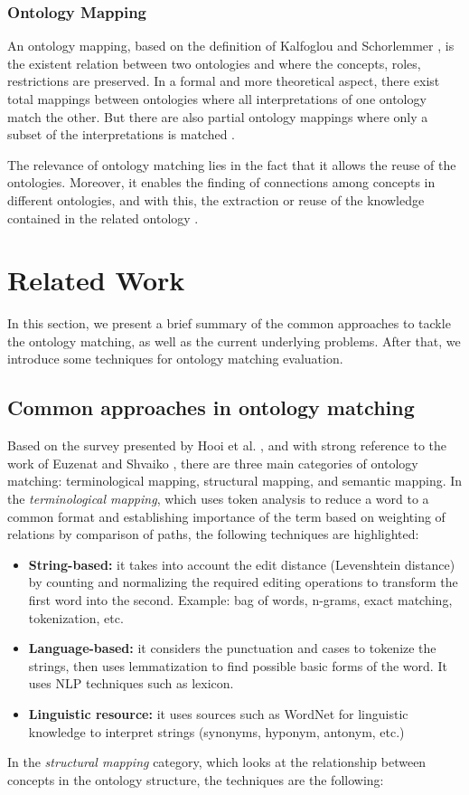 \documentclass[runningheads]{llncs}
\begin{document}
\subsubsection{Ontology Mapping} \label{ontology_mapping}
An ontology mapping, based on the definition of Kalfoglou and Schorlemmer \cite{Kalfoglou}, is the existent relation between two ontologies and where the concepts, roles, restrictions are preserved.
In a formal and more theoretical aspect, there exist total mappings between ontologies where all interpretations of one ontology match the other. But there are also partial ontology mappings where only a subset of the interpretations is matched \cite{Kalfoglou}.

The relevance of ontology matching lies in the fact that it allows the reuse of the ontologies. Moreover, it enables the finding of connections among concepts in different ontologies, and with this, the extraction or reuse of the knowledge contained in the related ontology \cite{ref_url3}.

\section{Related Work} \label{related_work}
In this section, we present a brief summary of the common approaches to tackle the ontology matching, as well as the current underlying problems. After that, we introduce some techniques for ontology matching evaluation.
\subsection{Common approaches in ontology matching}
Based on the survey presented by Hooi et al. \cite{Hooi}, and with strong reference to the work of Euzenat and Shvaiko \cite{Euzenat},  there are three main categories of ontology matching: terminological mapping, structural mapping, and semantic mapping.
In the \textit{terminological mapping}, which uses token analysis to reduce a word to a common format and establishing importance of the term based on weighting of relations by comparison of paths, the following techniques are highlighted:
\begin{itemize}
    \item \textbf{String-based:} it takes into account the edit distance (Levenshtein distance) by counting and normalizing the required editing operations to transform the first word into the second. Example: bag of words, n-grams, exact matching, tokenization, etc.
    \item \textbf{Language-based:} it considers the punctuation and cases to tokenize the strings, then uses lemmatization to find possible basic forms of the word. It uses NLP techniques such as lexicon.
    \item \textbf{Linguistic resource:} it uses sources such as WordNet for linguistic knowledge to interpret strings (synonyms, hyponym, antonym, etc.)
\end{itemize}
In the \textit{structural mapping} category, which looks at the relationship between concepts in the ontology structure, the techniques are the following:
\end{document}
